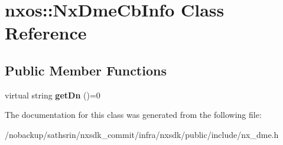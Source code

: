 \hypertarget{classnxos_1_1NxDmeCbInfo}{\section{nxos\-:\-:Nx\-Dme\-Cb\-Info Class Reference}
\label{classnxos_1_1NxDmeCbInfo}
}
\subsection*{Public Member Functions}
\begin{DoxyCompactItemize}
\item 
\hypertarget{classnxos_1_1NxDmeCbInfo_a818cb2b3fdfd56d3ec81438b7899ac08}{virtual string {\bfseries get\-Dn} ()=0}\label{classnxos_1_1NxDmeCbInfo_a818cb2b3fdfd56d3ec81438b7899ac08}

\end{DoxyCompactItemize}


The documentation for this class was generated from the following file\-:\begin{DoxyCompactItemize}
\item 
/nobackup/sathsrin/nxsdk\-\_\-commit/infra/nxsdk/public/include/nx\-\_\-dme.\-h\end{DoxyCompactItemize}
